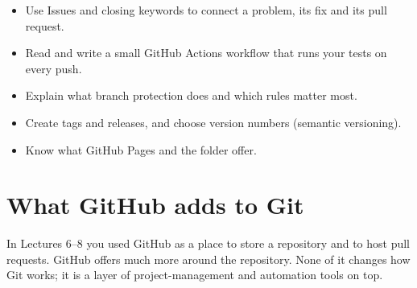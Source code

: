 


\begin{goals}
\begin{itemize}
  \item Use Issues and closing keywords to connect a problem, its fix and its pull request.
  \item Read and write a small GitHub Actions workflow that runs your tests on every push.
  \item Explain what branch protection does and which rules matter most.
  \item Create tags and releases, and choose version numbers (semantic versioning).
  \item Know what GitHub Pages and the  folder offer.
\end{itemize}
\end{goals}

\section{What GitHub adds to Git}

In Lectures 6--8 you used GitHub as a place to store a repository and to host pull requests. GitHub offers much more around the repository. None of it changes how Git works; it is a layer of project-management and automation tools on top.

